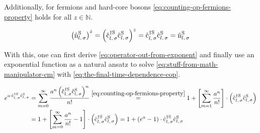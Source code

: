Additionally, for fermions and hard-core bosons \autoref{eq:counting-op-fermions-property} holds for all $z \in \mathbb{N}$.

\begin{equation}
    \label{eq:counting-op-fermions-property}
    \left(\nop[\schroedingerPicture]{l}{\sigma}\right)^z = 
    \left(\withspinop[\schroedingerPicture]{l}{\sigma}{\dagger}\withspinop[\schroedingerPicture]{l}{\sigma}{}\right)^z = 
    \withspinop[\schroedingerPicture]{l}{\sigma}{\dagger}\withspinop[\schroedingerPicture]{l}{\sigma}{} = 
    \nop[\schroedingerPicture]{l}{\sigma}
\end{equation}

With this, one can first derive \autoref{eq:operator-out-from-exponent} and finally use an exponential function as a natural ansatz to solve \autoref{eq:stuff-from-math-manipulator-cm} with \autoref{eq:the-final-time-dependence-cop}.

\begin{equation}
    \label{eq:operator-out-from-exponent}
    \begin{split}
        e^{a \cdot \withspinop[\schroedingerPicture]{l}{\sigma}{\dagger}\withspinop[\schroedingerPicture]{l}{\sigma}{}} &= \sum\limits_{m=0}^\infty \frac{a^n \left(\withspinop[\schroedingerPicture]{l}{\sigma}{\dagger}\withspinop[\schroedingerPicture]{l}{\sigma}{}\right)^n}{n!}
        \stackrel{\ref{eq:counting-op-fermions-property}}{=} 1 + \left[\sum\limits_{m=1}^\infty \frac{a^n}{n!}\right]\cdot \left(\withspinop[\schroedingerPicture]{l}{\sigma}{\dagger}\withspinop[\schroedingerPicture]{l}{\sigma}{}\right)\\
        &= 1 + \left[\sum\limits_{m=0}^\infty \frac{a^n}{n!}-1\right]\cdot \left(\withspinop[\schroedingerPicture]{l}{\sigma}{\dagger}\withspinop[\schroedingerPicture]{l}{\sigma}{}\right)
         = 1 + \left(e^a-1\right)\cdot \withspinop[\schroedingerPicture]{l}{\sigma}{\dagger}\withspinop[\schroedingerPicture]{l}{\sigma}{}
    \end{split}
\end{equation}


